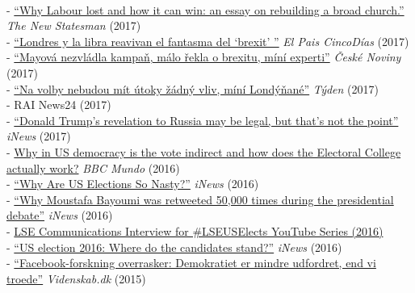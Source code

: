 \documentclass[12pt]{article}
\newcommand{\topic}[1]{\pagebreak[3]\indent {\color{lg}{\footnotesize #1 }}\\}
\newcommand{\subentry}[1]{{\color{lg}-} #1\vspace{.25em}\\}
\begin{document}
{	\topic{Media Coverage and Interviews}
        \subentry{\href{http://www.newstatesman.com/politics/uk/2017/07/why-labour-lost-and-how-it-can-win-essay-rebuilding-broad-church}{``Why Labour lost and how it can win: an essay on rebuilding a broad church.''} \textit{The New Statesman} (2017)}
		\subentry{\href{https://cincodias.elpais.com/cincodias/2017/06/07/mercados/1496862592_391146.html}{``Londres y la libra reavivan el fantasma del `brexit' ''} \textit{El Pais CincoD\'{i}as} (2017)}
        \subentry{\href{http://www.ceskenoviny.cz/zpravy/mayova-nezvladla-kampan-malo-rekla-o-brexitu-mini-experti/1494511}{``Mayov\'{a} nezvl\'{a}dla kampa\v{n}, m\'{a}lo \v{r}ekla o brexitu, m\'{i}n\'{i} experti''} \textit{\v{C}esk\'{e} Noviny} (2017)}
        \subentry{\href{http://www.tyden.cz/rubriky/zahranici/evropa/na-volby-nebudou-mit-utoky-zadny-vliv-mini-londynane_433320.html}{``Na volby nebudou m\'{i}t \'{u}toky \v{z}\'{a}dn\'{y} vliv, m\'{i}n\'{i} Lond\'{y}\v{n}an\'{e}''} \textit{T\'{y}den} (2017)}
		\subentry{RAI News24 (2017)}
        \subentry{\href{https://inews.co.uk/essentials/news/world/donald-trumps-revelations-russia-may-legal-thats-not-point/}{``Donald Trump's revelation to Russia may be legal, but that's not the point''} \textit{iNews} (2017)}
        \subentry{\href{http://www.bbc.com/mundo/noticias-internacional-37701880}{Why in US democracy is the vote indirect and how does the Electoral College actually work?} \textit{BBC Mundo} (2016)}
		\subentry{\href{https://inews.co.uk/essentials/news/world/us-elections-nasty/}{``Why Are US Elections So Nasty?''} \textit{iNews} (2016)}
		\subentry{\href{https://inews.co.uk/essentials/news/world/moustafa-bayoumi-retweeted-50000-presidential-debate/}{``Why Moustafa Bayoumi was retweeted 50,000 times during the presidential debate''} \textit{iNews} (2016)}
		\subentry{\href{https://www.youtube.com/watch?v=Hwm5V6H_qog&list=PLK4elntcUEy1a8P47lFQDg1oHoNq1BdYk&index=20}{LSE Communications Interview for \#LSEUSElects YouTube Series (2016)}}
		\subentry{\href{https://inews.co.uk/explainers/iq/candidates-stand-us-election-2016/}{``US election 2016: Where do the candidates stand?''} \textit{iNews} (2016)}
		\subentry{\href{http://videnskab.dk/kultur-samfund/facebook-forskning-overrasker-demokratiet-er-mindre-udfordret-end-vi-troede}{``Facebook-forskning overrasker: Demokratiet er mindre udfordret, end vi troede''} \textit{Videnskab.dk} (2015)}
	
}
\end{document}
